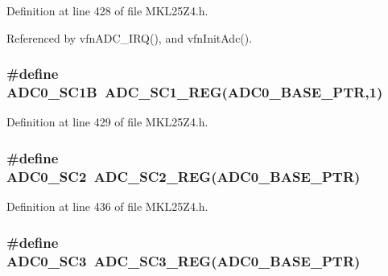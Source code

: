 Definition at line 428 of file M\+K\+L25\+Z4.\+h.



Referenced by vfn\+A\+D\+C\+\_\+\+I\+R\+Q(), and vfn\+Init\+Adc().

\subsubsection[{\texorpdfstring{A\+D\+C0\+\_\+\+S\+C1B}{ADC0_SC1B}}]{\setlength{\rightskip}{0pt plus 5cm}\#define A\+D\+C0\+\_\+\+S\+C1B~{\bf A\+D\+C\+\_\+\+S\+C1\+\_\+\+R\+EG}({\bf A\+D\+C0\+\_\+\+B\+A\+S\+E\+\_\+\+P\+TR},1)}\hypertarget{group___a_d_c___register___accessor___macros_ga9a83b6b66f4db147b1c3f952e62b57d5}{}\label{group___a_d_c___register___accessor___macros_ga9a83b6b66f4db147b1c3f952e62b57d5}


Definition at line 429 of file M\+K\+L25\+Z4.\+h.

\subsubsection[{\texorpdfstring{A\+D\+C0\+\_\+\+S\+C2}{ADC0_SC2}}]{\setlength{\rightskip}{0pt plus 5cm}\#define A\+D\+C0\+\_\+\+S\+C2~{\bf A\+D\+C\+\_\+\+S\+C2\+\_\+\+R\+EG}({\bf A\+D\+C0\+\_\+\+B\+A\+S\+E\+\_\+\+P\+TR})}\hypertarget{group___a_d_c___register___accessor___macros_gaecf9cc86d430a0b004e90ad7baec3fd2}{}\label{group___a_d_c___register___accessor___macros_gaecf9cc86d430a0b004e90ad7baec3fd2}


Definition at line 436 of file M\+K\+L25\+Z4.\+h.

\subsubsection[{\texorpdfstring{A\+D\+C0\+\_\+\+S\+C3}{ADC0_SC3}}]{\setlength{\rightskip}{0pt plus 5cm}\#define A\+D\+C0\+\_\+\+S\+C3~{\bf A\+D\+C\+\_\+\+S\+C3\+\_\+\+R\+EG}({\bf A\+D\+C0\+\_\+\+B\+A\+S\+E\+\_\+\+P\+TR})}\hypertarget{group___a_d_c___register___accessor___macros_ga616f246beb053dd75afc845afb200c4c}{}\label{group___a_d_c___register___accessor___macros_ga616f246beb053dd75afc845afb200c4c}



